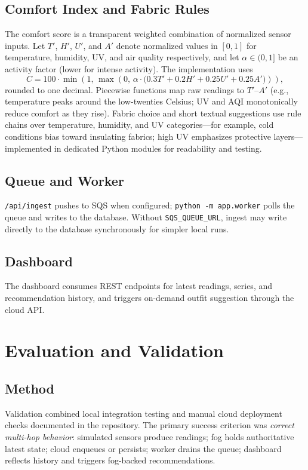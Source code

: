 \documentclass[conference]{IEEEtran}
\begin{document}
\subsection{Comfort Index and Fabric Rules}
The comfort score is a transparent weighted combination of normalized sensor inputs. Let $T'$, $H'$, $U'$, and $A'$ denote normalized values in $[0,1]$ for temperature, humidity, UV, and air quality respectively, and let $\alpha \in (0,1]$ be an activity factor (lower for intense activity). The implementation uses
\begin{equation}
C = 100 \cdot \min\!\left(1,\, \max\!\left(0,\, \alpha \cdot \bigl(0.3 T' + 0.2 H' + 0.25 U' + 0.25 A'\bigr)\right)\right),
\end{equation}
rounded to one decimal. Piecewise functions map raw readings to $T'$--$A'$ (e.g., temperature peaks around the low-twenties Celsius; UV and AQI monotonically reduce comfort as they rise). Fabric choice and short textual suggestions use rule chains over temperature, humidity, and UV categories---for example, cold conditions bias toward insulating fabrics; high UV emphasizes protective layers---implemented in dedicated Python modules for readability and testing.

\subsection{Queue and Worker}
\texttt{/api/ingest} pushes to SQS when configured; \texttt{python -m app.worker} polls the queue and writes to the database. Without \texttt{SQS\_QUEUE\_URL}, ingest may write directly to the database synchronously for simpler local runs.

\subsection{Dashboard}
The dashboard consumes REST endpoints for latest readings, series, and recommendation history, and triggers on-demand outfit suggestion through the cloud API.

\section{Evaluation and Validation}

\subsection{Method}
Validation combined local integration testing and manual cloud deployment checks documented in the repository. The primary success criterion was \emph{correct multi-hop behavior}: simulated sensors produce readings; fog holds authoritative latest state; cloud enqueues or persists; worker drains the queue; dashboard reflects history and triggers fog-backed recommendations.
\end{document}
